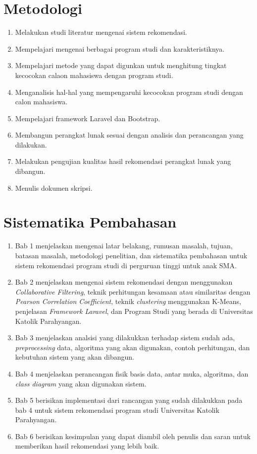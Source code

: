 \section{Metodologi}
\label{sec:metodologi}
\begin{enumerate}
	\item Melakukan studi literatur mengenai sistem rekomendasi.
	\item Mempelajari mengenai berbagai program studi dan karakteristiknya.
	\item Mempelajari metode yang dapat digunkan untuk menghitung tingkat kecocokan calaon mahasiswa dengan program studi.
	\item Menganalisis hal-hal yang mempengaruhi kecocokan program studi dengan calon mahasiswa.
	\item Mempelajari framework Laravel dan Bootstrap.
	\item Membangun perangkat lunak sesuai dengan analisis dan perancangan yang dilakukan.
	\item Melakukan pengujian kualitas hasil rekomendasi perangkat lunak yang dibangun.
	\item Menulis dokumen skripsi.
\end{enumerate}

\section{Sistematika Pembahasan}
\label{sec:sispem}
\begin{enumerate}
	\item Bab 1 menjelaskan mengenai latar belakang, rumusan masalah, tujuan, batasan masalah, metodologi penelitian, dan sistematika pembahasan untuk sistem rekomendasi program studi di perguruan tinggi untuk anak SMA.
	
	\item Bab 2 menjelaskan mengenai sistem rekomendasi dengan menggunakan \textit{Collaborative Filtering}, teknik perhitungan kesamaan atau similaritas dengan \textit{Pearson Correlation Coefficient}, teknik \textit{clustering} menggunakan K-Means, penjelasan \textit{Framework Laravel}, dan Program Studi yang berada di Universitas Katolik Parahyangan. 
	
	\item Bab 3 menjelaskan analsisi yang dilakukkan terhadap sistem sudah ada, \textit{preprocessing} data, algoritma yang akan digunakan, contoh perhitungan, dan kebutuhan sistem yang akan dibangun.
	
	\item Bab 4 menjelaskan perancangan fisik basis data, antar muka, algoritma, dan \textit{class diagram} yang akan digunakan sistem.
	
	\item Bab 5 berisikan implementasi dari rancangan yang sudah dilakukkan pada bab 4 untuk sistem rekomendasi program studi Universitas Katolik Parahyangan.
	
	\item Bab 6 berisikan kesimpulan yang dapat diambil oleh penulis dan saran untuk memberikan hasil rekomendasi yang lebih baik.
\end{enumerate}
